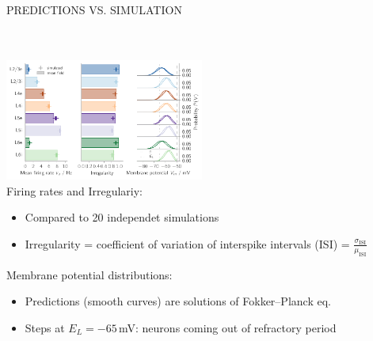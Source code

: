 \documentclass[portrait, final, a0paper, fontscale=0.34, leqno]{baposter}
\begin{document}
\begin{poster}
{\begin{minipage}{0.98\linewidth}
    \vspace{0.3cm}
    \centerline{\uppercase{Predictions vs. simulation}}
    \begin{multicols}{2}
        ~\\~\\
        \includegraphics[height=4.0cm]{results}  
        \columnbreak \\
        Firing rates and Irregulariy:
        \vspace{-\topsep}
        \begin{itemize}
            \setlength\itemsep{0.01cm}
            \item Compared to 20 independet simulations
            \item Irregularity = 
                coefficient of variation of interspike intervals (ISI) = 
            $\frac{\sigma_\text{ISI}}{\mu_\text{ISI}}$
        \end{itemize}
        Membrane potential distributions:
        \vspace{-\topsep}
        \begin{itemize}
            \setlength\itemsep{0.01cm}
            \item Predictions (smooth curves) are solutions of 
                Fokker--Planck eq.
            \item Steps at $E_L = -65$\,mV: neurons coming out of refractory period
        \end{itemize}
    \end{multicols}
        

\end{minipage}}
\end{poster}
\end{document}
